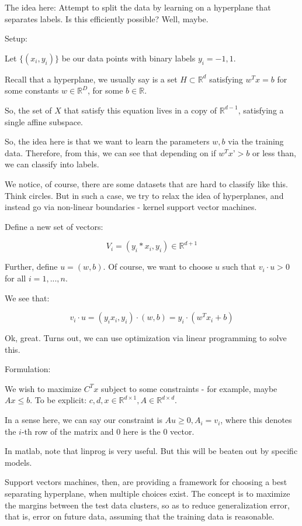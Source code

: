 \documentclass[10pt]{article}
\begin{document}
The idea here: Attempt to split the data by learning on a hyperplane that separates labels. Is this efficiently possible? Well, maybe.

Setup:

Let $\{ (x_i, y_i) \}$ be our data points with binary labels $y_i = -1,1$.

Recall that a hyperplane, we usually say is a set $H \subset \mathbb{R}^d$ satisfying $w^T x = b$ for some constants $w \in \mathbb{R}^D$, for some $b \in \mathbb{R}$.

So, the set of $X$ that satisfy this equation lives in a copy of $\mathbb{R}^{d-1}$, satisfying a single affine subspace.

So, the idea here is that we want to learn the parameters $w, b$ via the training data. Therefore, from this, we can see that depending on if $w^T x’ > b$ or less than, we can classify into labels. 

We notice, of course, there are some datasets that are hard to classify like this. Think circles. But in such a case, we try to relax the idea of hyperplanes, and instead go via non-linear boundaries - kernel support vector machines.

Define a new set of vectors:

$$V_i = ( y_i * x_i , y_i ) \in \mathbb{R}^{d+1} $$

Further, define $u = (w,b)$. Of course, we want to choose $u$ such that $v_i \cdot u > 0$ for all $i = 1,...,n$.

We see that:

$$ v_i \cdot u = (y_i x_i, y_i ) \cdot (w,b) = y_i \cdot (w^T x_i + b) $$

Ok, great. Turns out, we can use optimization via linear programming to solve this. 

Formulation:

We wish to maximize $C^T x$ subject to some constraints - for example, maybe $Ax \leq b$. To be explicit: $c,d , x \in \mathbb{R}^{d \times 1}, A \in \mathbb{R}^{d \times d}$.

In a sense here, we can say our constraint is $Au \geq 0, A_{i} = v_i$, where this denotes the $i$-th row of the matrix and 0 here is the 0 vector. 

In matlab, note that linprog is very useful. But this will be beaten out by specific models.

Support vectors machines, then, are providing a framework for choosing a best separating hyperplane, when multiple choices exist. The concept is to maximize the margins between the test data clusters, so as to reduce generalization error, that is, error on future data, assuming that the training data is reasonable.
\end{document}
